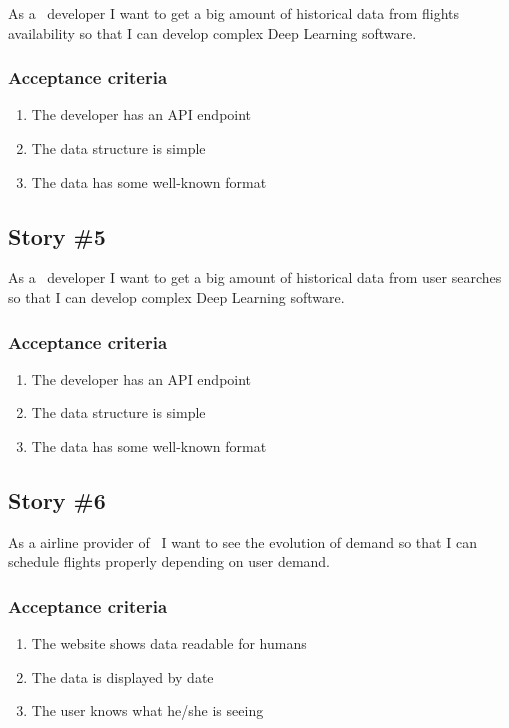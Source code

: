 \begin{displayquote}
As a \company\ developer I want to get a big amount of historical data from flights availability so that I can develop complex Deep Learning software.
\end{displayquote}

\subsubsection*{Acceptance criteria}

\begin{enumerate}
    \item The developer has an API endpoint
    \item The data structure is simple
    \item The data has some well-known format
\end{enumerate}

\subsection*{Story \#5}

\begin{displayquote}
As a \company\ developer I want to get a big amount of historical data from user searches so that I can develop complex Deep Learning software.
\end{displayquote}

\subsubsection*{Acceptance criteria}

\begin{enumerate}
    \item The developer has an API endpoint
    \item The data structure is simple
    \item The data has some well-known format
\end{enumerate}

\subsection*{Story \#6}

\begin{displayquote}
As a airline provider of \company\ I want to see the evolution of demand so that I can schedule flights properly depending on user demand.
\end{displayquote}

\subsubsection*{Acceptance criteria}

\begin{enumerate}
    \item The website shows data readable for humans
    \item The data is displayed by date
    \item The user knows what he/she is seeing
\end{enumerate}


